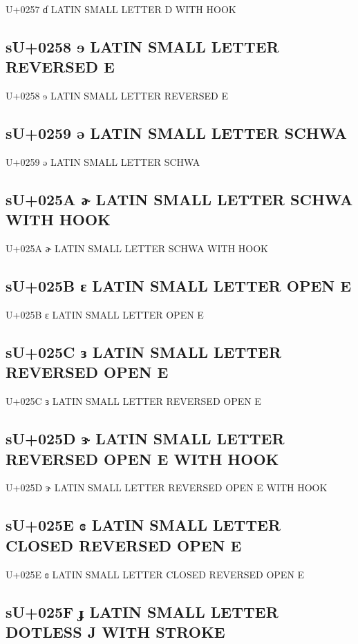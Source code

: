 U+0257 ɗ LATIN SMALL LETTER D WITH HOOK

\subsection{sU+0258 ɘ LATIN SMALL LETTER REVERSED E}

U+0258 ɘ LATIN SMALL LETTER REVERSED E

\iftestgreek
\subsection{sU+0259 ə LATIN SMALL LETTER SCHWA}

U+0259 ə LATIN SMALL LETTER SCHWA
\fi

\subsection{sU+025A ɚ LATIN SMALL LETTER SCHWA WITH HOOK}

U+025A ɚ LATIN SMALL LETTER SCHWA WITH HOOK

\subsection{sU+025B ɛ LATIN SMALL LETTER OPEN E}

U+025B ɛ LATIN SMALL LETTER OPEN E

\subsection{sU+025C ɜ LATIN SMALL LETTER REVERSED OPEN E}

U+025C ɜ LATIN SMALL LETTER REVERSED OPEN E

\subsection{sU+025D ɝ LATIN SMALL LETTER REVERSED OPEN E WITH HOOK}

U+025D ɝ LATIN SMALL LETTER REVERSED OPEN E WITH HOOK

\subsection{sU+025E ɞ LATIN SMALL LETTER CLOSED REVERSED OPEN E}

U+025E ɞ LATIN SMALL LETTER CLOSED REVERSED OPEN E

\subsection{sU+025F ɟ LATIN SMALL LETTER DOTLESS J WITH STROKE}

